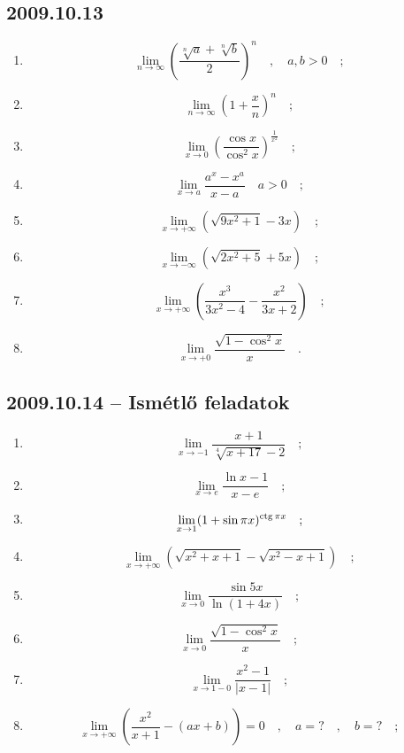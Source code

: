 \subsection*{2009.10.13}
\begin{enumerate}
\item $$\lim_{n\to \infty}\left(\frac{\sqrt[n]{a}+\sqrt[n]{b}}{2}\right)^n\quad,\quad a,b>0\quad;$$
\item $$\lim_{n\to\infty}\left(1+\frac{x}{n}\right)^n\quad;$$
\item $$\lim_{x\to 0}\left(\frac{\cos x}{\cos ^2 x}\right)^{\frac{1}{x^2}}\quad;$$
\item $$\lim_{x\to a}\frac{a^x-x^{a}}{x-a}\quad a>0\quad;$$
\item $$\lim_{x\to +\infty}\left(\sqrt{9x^2+1}-3x\right)\quad;$$
\item $$\lim_{x\to -\infty}\left(\sqrt{2x^2+5}+5x\right)\quad;$$
\item $$\lim_{x\to +\infty}\left(\frac{x^3}{3x^2-4}-\frac{x^2}{3x+2}\right)\quad;$$
\item $$\lim_{x\to+0}\frac{\sqrt{1-\cos ^2x}}{x}\quad.$$
\end{enumerate}
\subsection*{2009.10.14 -- Ismétlő feladatok}
\begin{enumerate}
\item $$\lim_{x\to -1}\frac{x+1}{\sqrt[4]{x+17}-2}\quad;$$
\item $$\lim_{x\to e}\frac{\ln x-1}{x-e}\quad;$$
\item $$\lim_{x\to 1}(1+\sin\pi x)^{\mathop{\mathrm{ctg}}\nolimits\pi x}\quad;$$
\item $$\lim_{x\to +\infty}\left(\sqrt{x^2+x+1}-\sqrt{x^2-x+1}\right)\quad;$$
\item $$\lim_{x\to 0}\frac{\sin 5x}{\ln(1+4x)}\quad;$$
\item $$\lim_{x\to 0}\frac{\sqrt{1-\cos^2 x}}{x}\quad;$$
\item $$\lim_{x\to 1-0}\frac{x^2-1}{|x-1|}\quad;$$
\item $$\lim_{x\to +\infty}\left(\frac{x^2}{x+1}-(ax+b)\right)=0\quad,\quad a=?\quad,\quad b=?\quad;$$
\end{enumerate}
